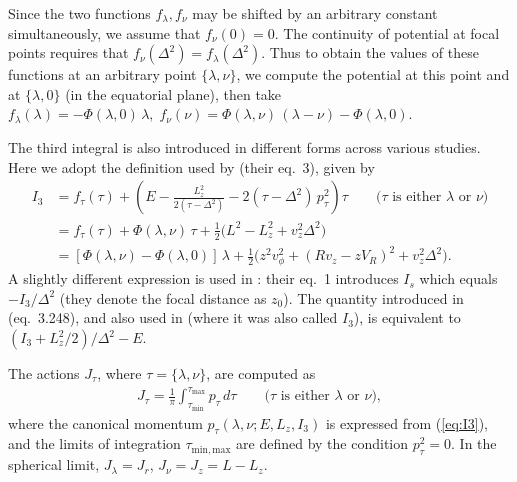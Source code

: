 \documentclass[12pt]{article}
\begin{document}
Since the two functions $f_\lambda,f_\nu$ may be shifted by an arbitrary constant simultaneously, we assume that $f_\nu(0)=0$. The continuity of potential at focal points requires that $f_\nu(\Delta^2)=f_\lambda(\Delta^2)$. Thus to obtain the values of these functions at an arbitrary point $\{\lambda,\nu\}$, we compute the potential at this point and at $\{\lambda,0\}$ (in the equatorial plane), then take $f_\lambda(\lambda) = -\Phi(\lambda,0)\,\lambda,\; f_\nu(\nu) = \Phi(\lambda,\nu)\,(\lambda-\nu) - \Phi(\lambda,0)$.

The third integral is also introduced in different forms across various studies.
Here we adopt the definition used by \cite{Sanders2012} (their eq.~3), given by
\begin{subequations}
\begin{align}
I_3 &= f_\tau(\tau) + \left( E - \frac{L_z^2}{2(\tau-\Delta^2)} - 2(\tau-\Delta^2)\,p_\tau^2 \right) \tau \qquad\mbox{($\tau$ is either $\lambda$ or $\nu$)}  \label{eq:I3} \\
&= f_\tau(\tau) + \Phi(\lambda,\nu)\,\tau +
\textstyle \frac12 \big( L^2 - L_z^2 + v_z^2\Delta^2 \big) \nonumber \\
&= [\Phi(\lambda,\nu) - \Phi(\lambda,0)]\,\lambda +
\textstyle \frac12 \big( z^2 v_\phi^2 + (R v_z - z V_R)^2 + v_z^2\Delta^2 \big) . \label{eq:I3init}
\end{align}
\end{subequations}
A slightly different expression is used in \cite{Bienayme2015}: their eq.~1 introduces $I_s$ which equals $-I_3/\Delta^2$ (they denote the focal distance as $z_0$). 
The quantity introduced in \cite{BinneyTremaine} (eq.~3.248), and also used in \cite{Binney2012} (where it was also called $I_3$), is equivalent to $(I_3 + L_z^2/2) / \Delta^2 - E$.

The actions $J_\tau$, where $\tau=\{\lambda,\nu\}$, are computed as
\begin{align}  \label{eq:ActionsStaeckel}
J_\tau = \frac{1}{\pi} \int_{\tau_\mathrm{min}}^{\tau_\mathrm{max}} p_\tau\,d\tau
\qquad\mbox{($\tau$ is either $\lambda$ or $\nu$)},
\end{align}
where the canonical momentum $p_\tau(\lambda,\nu;E,L_z,I_3)$ is expressed from (\ref{eq:I3}), and the limits of integration $\tau_\mathrm{min,max}$ are defined by the condition $p_\tau^2=0$. In the spherical limit, $J_\lambda = J_r$, $J_\nu = J_z = L-L_z$.
\end{document}
